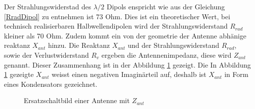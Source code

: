 Der Strahlungswiderstad des $\lambda/2$ Dipols enspricht wie aus der Gleichung \ref{RradDipol} zu entnehmen ist 73 Ohm. Dies ist ein theoretischer Wert, bei technisch realisierbaren Halbwellendipolen wird der Strahlungswiderstand $R_{rad}$ kleiner als 70 Ohm. Zudem kommt  ein von der  geometrie der Antenne abhänige reaktanz $X_{ant}$ hinzu.
Die Reaktanz $X_{ant}$ und der Strahlungswiderstand $R_{rad}$, sowie der Verlustwiderstand $R_v$ ergeben die Antennenimpedanz, diese wird $Z_{ant}$  genannt. Dieser Zusammenhang ist  in der Abbildung \ref{fig:ESBantenneZant} gezeigt. Die In Abbildung \ref{fig:ESBantenneZant} gezeigte $X_{ant}$ weisst einen negativen Imaginärteil auf, deshalb ist $X_{ant}$ in Form eines Kondensators gezeichnet.
\begin{figure}[h!]%
	\begin{center}
	\end{center}
\caption{Ersatzschaltbild einer Antenne mit $Z_{ant}$}
\label{fig:ESBantenneZant}
\end{figure}


